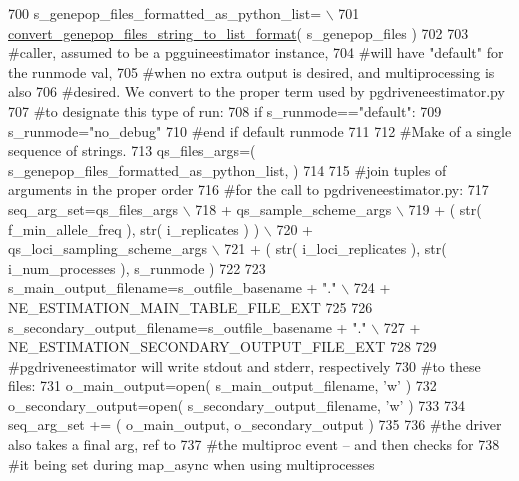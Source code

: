 \begin{DoxyCode}
700         s\_genepop\_files\_formatted\_as\_python\_list= \(\backslash\)
701                 \hyperlink{namespacenegui_1_1pgutilities_aed0f15b22462914445ffe1ec2a77cbc8}{convert\_genepop\_files\_string\_to\_list\_format}( 
      s\_genepop\_files )
702 
703         \textcolor{comment}{#caller, assumed to be a pgguineestimator instance,}
704         \textcolor{comment}{#will have "default" for the runmode val, }
705         \textcolor{comment}{#when no extra output is desired, and multiprocessing is also}
706         \textcolor{comment}{#desired.  We convert to the proper term used by pgdriveneestimator.py}
707         \textcolor{comment}{#to designate this type of run:}
708         \textcolor{keywordflow}{if} s\_runmode==\textcolor{stringliteral}{"default"}:
709             s\_runmode=\textcolor{stringliteral}{"no\_debug"}
710         \textcolor{comment}{#end if default runmode}
711 
712         \textcolor{comment}{#Make of a single sequence of strings.}
713         qs\_files\_args=( s\_genepop\_files\_formatted\_as\_python\_list, ) 
714 
715         \textcolor{comment}{#join tuples of arguments in the proper order}
716         \textcolor{comment}{#for the call to pgdriveneestimator.py:}
717         seq\_arg\_set=qs\_files\_args \(\backslash\)
718                         + qs\_sample\_scheme\_args \(\backslash\)
719                         + ( str( f\_min\_allele\_freq ), str( i\_replicates ) ) \(\backslash\)
720                         + qs\_loci\_sampling\_scheme\_args \(\backslash\)
721                         + ( str( i\_loci\_replicates ), str( i\_num\_processes ), s\_runmode ) 
722 
723         s\_main\_output\_filename=s\_outfile\_basename + \textcolor{stringliteral}{"."} \(\backslash\)
724                 + NE\_ESTIMATION\_MAIN\_TABLE\_FILE\_EXT
725 
726         s\_secondary\_output\_filename=s\_outfile\_basename + \textcolor{stringliteral}{"."} \(\backslash\)
727                 + NE\_ESTIMATION\_SECONDARY\_OUTPUT\_FILE\_EXT
728 
729         \textcolor{comment}{#pgdriveneestimator will write stdout and stderr, respectively}
730         \textcolor{comment}{#to these files:}
731         o\_main\_output=open( s\_main\_output\_filename, \textcolor{stringliteral}{'w'} )
732         o\_secondary\_output=open( s\_secondary\_output\_filename, \textcolor{stringliteral}{'w'} )
733 
734         seq\_arg\_set += ( o\_main\_output, o\_secondary\_output )
735         
736         \textcolor{comment}{#the driver also takes a final arg, ref to}
737         \textcolor{comment}{#the multiproc event -- and then checks for }
738         \textcolor{comment}{#it being set during map\_async when using multiprocesses}

\end{DoxyCode}
